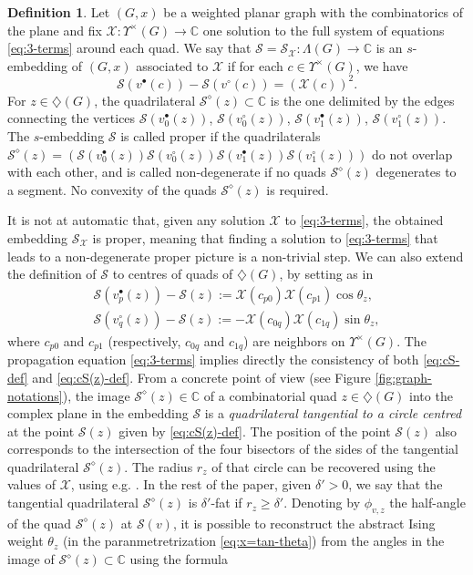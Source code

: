 \documentclass[reqno]{amsart}
\numberwithin{equation}{section}
\theoremstyle{definition}
\newtheorem{definition}[theo]{Definition}
\theoremstyle{remark}
\newcommand\C{\mathbb{C}}
\newcommand\cS{\mathcal{S}}
\newcommand\cX{\mathcal{X}}
\newcommand\dm{\diamond}
\newcommand\Dm{\diamondsuit}
\begin{document}
\begin{definition}\label{def:cS-def}
Let $(G,x)$ be a weighted planar graph with the combinatorics of the plane and fix $\cX:\Upsilon^\times(G)\to\C$ one solution to the full system of equations \eqref{eq:3-terms} around each quad. We say that $\cS=\cS_\cX:\! \Lambda(G)\to\C$ is an $s$-embedding of $(G,x)$ associated to $\cX$ if for each $c\in\Upsilon^\times(G)$, we have
\begin{equation}
\label{eq:cS-def}
\cS(v^\bullet(c))-\cS(v^\circ(c))=(\cX(c))^2.
\end{equation}
For $z\in\Dm(G)$, the quadrilateral $\cS^\dm(z)\subset\C$ is the one delimited by the edges connecting the vertices $\cS(v_0^\bullet(z))$, $\cS(v_0^\circ(z))$, $\cS(v_1^\bullet(z))$, $\cS(v_1^\circ(z))$. The $s$-embedding $\cS$ is called proper if the quadrilaterals $\cS^\dm(z) =(\cS(v_0^\bullet(z)) \cS(v_0^\circ(z)) \cS(v_1^\bullet(z)) \cS(v_1^\circ(z)))$ do not overlap with each other, and is called non-degenerate if no quads $\cS^\dm(z)$ degenerates to a segment. No convexity of the quads $\cS^\dm(z)$ is required.
\end{definition}
It is not at automatic that, given any solution $\cX $ to \eqref{eq:3-terms}, the obtained embedding $\mathcal{S}_{\cX}$ is proper, meaning that finding a solution to \eqref{eq:3-terms} that leads to a non-degenerate proper picture is a non-trivial step. We can also extend the definition of $\cS$ to centres of quads of $\Dm(G)$, by setting as in \cite[Equation (2.5)]{Che20}
\begin{equation}\label{eq:cS(z)-def}
\begin{array}{l}
\cS(v_p^\bullet(z))-\cS(z):=\cX(c_{p0})\cX(c_{p1})\cos\theta_z,\\[2pt]
\cS(v_q^\circ(z))-\cS(z):=-\cX(c_{0q})\cX(c_{1q})\sin\theta_z,
\end{array}
\end{equation}
where $c_{p0}$ and $c_{p1}$ (respectively, $c_{0q}$ and $c_{1q}$) are neighbors on $\Upsilon^\times(G)$.
The propagation equation \eqref{eq:3-terms} implies directly the consistency of both  \eqref{eq:cS-def} and \eqref{eq:cS(z)-def}. From a concrete point of view (see Figure \eqref{fig:graph-notations}), the image $\cS^\dm(z) \in \mathbb{C}$ of a combinatorial quad $z\in \diamondsuit(G)$ into the complex plane in the embedding $ \cS$ is a \emph{quadrilateral tangential to a circle centred} at the point $\cS(z)$ given by \eqref{eq:cS(z)-def}. The position of the point $\cS(z)$ also corresponds to the intersection of the four bisectors of the sides of the tangential quadrilateral $\cS^\dm(z)$. The radius $r_z$ of that circle can be recovered using the values of $\cX $, using e.g. \cite[Equation (2.7)]{Che20}. In the rest of the paper, given $\delta'>0$, we say that the tangential quadrilateral $\cS^\dm(z)$ is $\delta'$-fat if $r_z\geq \delta' $. Denoting by $\phi_{v,z}$ the half-angle of the quad $\cS^\dm(z)$ at $\cS(v)$, it is possible to reconstruct the abstract Ising weight $\theta_z$ (in the paranmetretrization \eqref{eq:x=tan-theta}) from the angles in the image of $\cS^\dm(z)\subset\C$ using the formula \cite[Equation (2.8)]{Che20}
\end{document}
